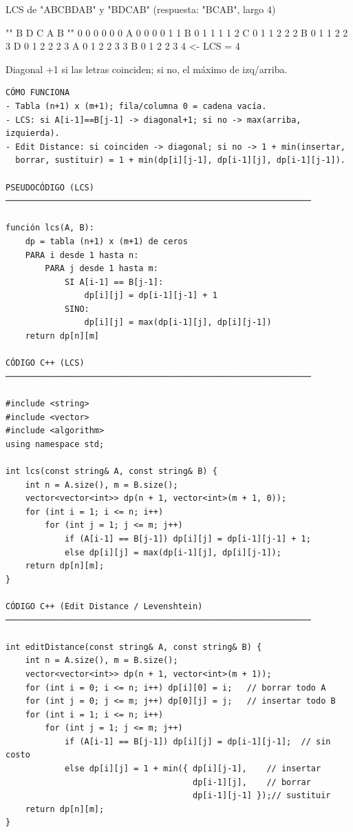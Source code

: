 \begin{dsadiagrama}
LCS de "ABCBDAB" y "BDCAB"   (respuesta: "BCAB", largo 4)

        ""  B  D  C  A  B
    ""   0  0  0  0  0  0
    A    0  0  0  0  1  1
    B    0  1  1  1  1  2
    C    0  1  1  2  2  2
    B    0  1  1  2  2  3
    D    0  1  2  2  2  3
    A    0  1  2  2  3  3
    B    0  1  2  2  3  4   <- LCS = 4

Diagonal +1 si las letras coinciden; si no, el máximo de izq/arriba.
\end{dsadiagrama}

\begin{lstlisting}
CÓMO FUNCIONA
- Tabla (n+1) x (m+1); fila/columna 0 = cadena vacía.
- LCS: si A[i-1]==B[j-1] -> diagonal+1; si no -> max(arriba, izquierda).
- Edit Distance: si coinciden -> diagonal; si no -> 1 + min(insertar,
  borrar, sustituir) = 1 + min(dp[i][j-1], dp[i-1][j], dp[i-1][j-1]).

PSEUDOCÓDIGO (LCS)
──────────────────────────────────────────────────────────────

función lcs(A, B):
    dp = tabla (n+1) x (m+1) de ceros
    PARA i desde 1 hasta n:
        PARA j desde 1 hasta m:
            SI A[i-1] == B[j-1]:
                dp[i][j] = dp[i-1][j-1] + 1
            SINO:
                dp[i][j] = max(dp[i-1][j], dp[i][j-1])
    return dp[n][m]

CÓDIGO C++ (LCS)
──────────────────────────────────────────────────────────────

#include <string>
#include <vector>
#include <algorithm>
using namespace std;

int lcs(const string& A, const string& B) {
    int n = A.size(), m = B.size();
    vector<vector<int>> dp(n + 1, vector<int>(m + 1, 0));
    for (int i = 1; i <= n; i++)
        for (int j = 1; j <= m; j++)
            if (A[i-1] == B[j-1]) dp[i][j] = dp[i-1][j-1] + 1;
            else dp[i][j] = max(dp[i-1][j], dp[i][j-1]);
    return dp[n][m];
}

CÓDIGO C++ (Edit Distance / Levenshtein)
──────────────────────────────────────────────────────────────

int editDistance(const string& A, const string& B) {
    int n = A.size(), m = B.size();
    vector<vector<int>> dp(n + 1, vector<int>(m + 1));
    for (int i = 0; i <= n; i++) dp[i][0] = i;   // borrar todo A
    for (int j = 0; j <= m; j++) dp[0][j] = j;   // insertar todo B
    for (int i = 1; i <= n; i++)
        for (int j = 1; j <= m; j++)
            if (A[i-1] == B[j-1]) dp[i][j] = dp[i-1][j-1];  // sin costo
            else dp[i][j] = 1 + min({ dp[i][j-1],    // insertar
                                      dp[i-1][j],    // borrar
                                      dp[i-1][j-1] });// sustituir
    return dp[n][m];
}


\end{lstlisting}
